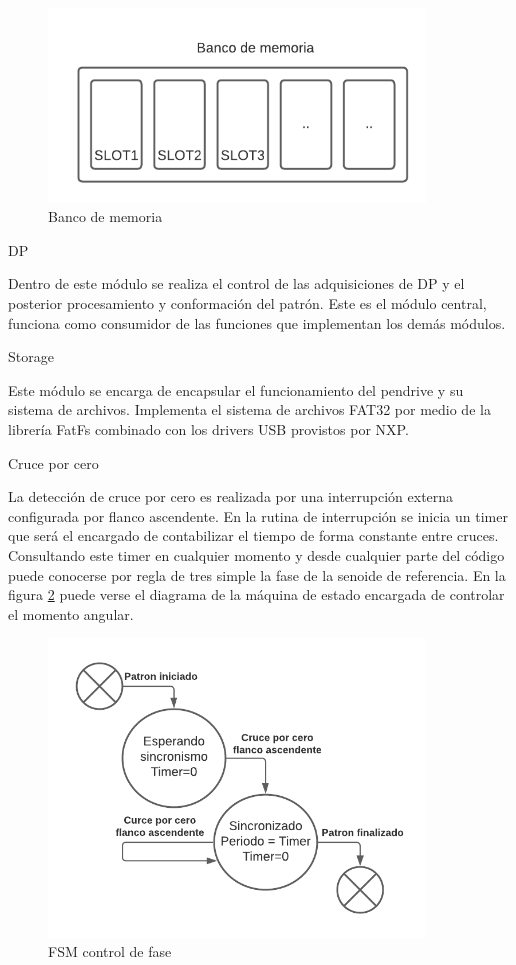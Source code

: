 \begin{figure}[ht]
	\centering
	\includegraphics[width=100mm]{./Figures/firmBanco.png}
	\caption{Banco de memoria}
	\label{fig:firmBanco}
\end{figure}

\vspace{10mm}
DP

Dentro de este módulo se realiza el control de las adquisiciones de DP y el posterior procesamiento y conformación del patrón. Este es el módulo central, funciona como consumidor de las funciones que implementan los demás módulos.

\vspace{10mm}

Storage

Este módulo se encarga de encapsular el funcionamiento del pendrive y su sistema de archivos. Implementa el sistema de archivos FAT32 por medio de la librería FatFs \citep{chanWeb:1} combinado con los drivers USB provistos por NXP.

\vspace{10mm}

Cruce por cero

La detección de cruce por cero es realizada por una interrupción externa configurada por flanco ascendente. En la rutina de interrupción se inicia un timer que será el encargado de contabilizar el tiempo de forma constante entre cruces. Consultando este timer en cualquier momento y desde cualquier parte del código puede conocerse por regla de tres simple la fase de la senoide de referencia. En la figura \ref{fig:firmFSM} puede verse el diagrama de la máquina de estado encargada de controlar el momento angular.

\begin{figure}[ht]
	\centering
	\includegraphics[width=100mm]{./Figures/firmZCFSM.png}
	\caption{FSM control de fase}
	\label{fig:firmFSM}
\end{figure}

